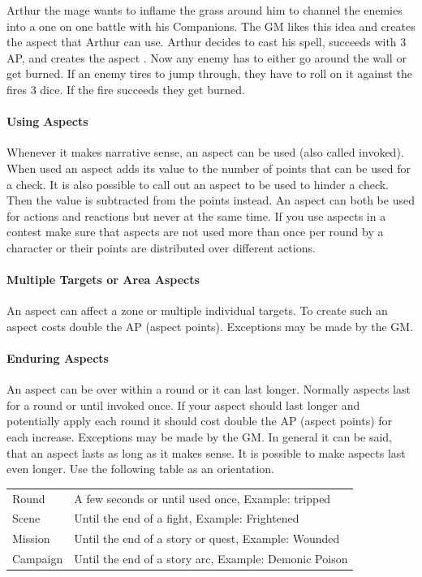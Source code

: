 \documentclass[11pt]{article}
\begin{document}
{\begin{pwexample}
Arthur the mage wants to inflame the grass around him to channel the enemies into a one on one battle with his Companions. The GM likes this idea and creates the aspect  that Arthur can use. Arthur decides to cast his spell, succeeds with 3 AP, and creates the aspect . Now any enemy has to either go around the wall or get burned. If an enemy tires to jump through, they have to roll on it against the fires 3 dice. If the fire succeeds they get burned.
\end{pwexample}
\paragraph*{Using Aspects}
\label{sec:orgfa3c532}

Whenever it makes narrative sense, an aspect can be used (also called invoked). When used an aspect adds its value to the number of points that can be used for a check. It is also possible to call out an aspect to be used to hinder a check. Then the value is subtracted from the points instead. An aspect can both be used for actions and reactions but never at the same time. If you use  aspects in a contest make sure that aspects are not used more than once per round by a character or their points are distributed over different actions.
\paragraph*{Multiple Targets or Area Aspects}
\label{sec:orgdb6fd9e}
An aspect can affect a zone or multiple individual targets. To create such an aspect costs double the AP (aspect points). Exceptions may be made by the GM. 
\paragraph*{Enduring Aspects}
\label{sec:orgd4ba133}
An aspect can be over within a round or it can last longer. Normally aspects last for a round or until invoked once. If your aspect should last longer and potentially apply each round it should cost double the AP (aspect points) for each increase. Exceptions may be made by the GM. In general it can be said, that an aspect lasts as long as it makes sense. It is possible to make aspects last even longer. Use the following table as an orientation.
\begin{center}
\begin{tabular}{ll}
Round & A few seconds or until used once, Example: tripped\\
Scene & Until the end of a fight, Example: Frightened\\
Mission & Until the end of a story or quest, Example: Wounded\\
Campaign & Until the end of a story arc, Example: Demonic Poison\\
\end{tabular}
\end{center}

}
\end{document}
